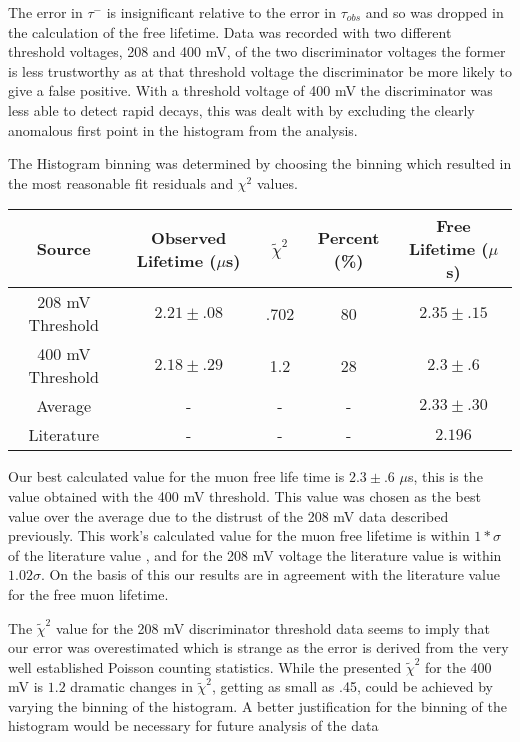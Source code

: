 \documentclass[11pt,letterpaper]{article}
\begin{document}
The error in $\tau^-$ is insignificant relative to the error in $\tau_{obs}$ and so was dropped in the calculation of the free lifetime. Data was recorded with two different threshold voltages, 208 and 400 mV, of the two discriminator voltages the former is less trustworthy as at that threshold voltage the discriminator be more likely to give a false positive. With a threshold voltage of 400 mV the discriminator was less able to detect rapid decays, this was dealt with by excluding the clearly anomalous first point in the histogram from the analysis.

The Histogram binning was determined by choosing the binning which resulted in the most reasonable fit residuals and $\chi^2$ values.
\begin{center}
	\begin{tabular}{|c|c|c|c|c|}\hline
		Source & Observed Lifetime ($\mu$s)& $\tilde{\chi}^2$&Percent (\%)&Free Lifetime ($\mu$s)\\ \hline\hline
		208 mV Threshold &$2.21\pm .08$ & .702 & 80 &$2.35 \pm .15$  \\ \hline
		400 mV Threshold & $2.18\pm .29$& 1.2  & 28 &$2.3 \pm .6$ \\ \hline
		Average          & -            &-     &-&$2.33 \pm .30$\\ \hline
        Literature       & -            &-     &-&$2.196$  \\ \hline
	\end{tabular}
\end{center}
Our best calculated value for the muon free life time is $2.3 \pm .6$ $\mu$s, this is the value obtained with the 400 mV threshold. This value was chosen as the best value over the average due to the distrust of the 208 mV data described previously. This work's calculated value for the muon free lifetime is within $1*\sigma$ of the literature value , and for the 208 mV voltage the literature value is within $1.02\sigma$. On the basis of this our results are in agreement with the literature value for the free muon lifetime.

The $\tilde{\chi}^2$ value for the 208 mV discriminator threshold data seems to imply that our error was overestimated which is strange as the error is derived from the very well established Poisson counting statistics. While the presented $\tilde{\chi}^2$ for the 400 mV is $1.2$ dramatic changes in $\tilde{\chi}^2$, getting as small as .45, could be achieved by varying the binning of the histogram. A better justification for the binning of the histogram would be necessary for future analysis of the data
\end{document}
